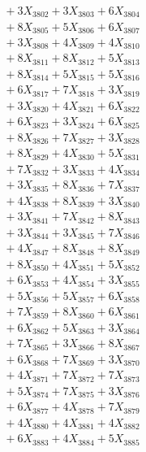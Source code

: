 \documentclass[a4paper,10pt]{article}
\begin{document}
{\begin{align}
&\;  + 3 X_{3802} + 3 X_{3803} + 6 X_{3804} \\[0.3ex]
&\;  + 8 X_{3805} + 5 X_{3806} + 6 X_{3807} \\[0.3ex]
&\;  + 3 X_{3808} + 4 X_{3809} + 4 X_{3810} \\[0.3ex]
&\;  + 8 X_{3811} + 8 X_{3812} + 5 X_{3813} \\[0.3ex]
&\;  + 8 X_{3814} + 5 X_{3815} + 5 X_{3816} \\[0.3ex]
&\;  + 6 X_{3817} + 7 X_{3818} + 3 X_{3819} \\[0.5ex]\allowbreak
&\;  + 3 X_{3820} + 4 X_{3821} + 6 X_{3822} \\[0.3ex]
&\;  + 6 X_{3823} + 3 X_{3824} + 6 X_{3825} \\[0.3ex]
&\;  + 8 X_{3826} + 7 X_{3827} + 3 X_{3828} \\[0.3ex]
&\;  + 8 X_{3829} + 4 X_{3830} + 5 X_{3831} \\[0.3ex]
&\;  + 7 X_{3832} + 3 X_{3833} + 4 X_{3834} \\[0.3ex]
&\;  + 3 X_{3835} + 8 X_{3836} + 7 X_{3837} \\[0.3ex]
&\;  + 4 X_{3838} + 8 X_{3839} + 3 X_{3840} \\[0.3ex]
&\;  + 3 X_{3841} + 7 X_{3842} + 8 X_{3843} \\[0.3ex]
&\;  + 3 X_{3844} + 3 X_{3845} + 7 X_{3846} \\[0.3ex]
&\;  + 4 X_{3847} + 8 X_{3848} + 8 X_{3849} \\[0.5ex]\allowbreak
&\;  + 8 X_{3850} + 4 X_{3851} + 5 X_{3852} \\[0.3ex]
&\;  + 6 X_{3853} + 4 X_{3854} + 3 X_{3855} \\[0.3ex]
&\;  + 5 X_{3856} + 5 X_{3857} + 6 X_{3858} \\[0.3ex]
&\;  + 7 X_{3859} + 8 X_{3860} + 6 X_{3861} \\[0.3ex]
&\;  + 6 X_{3862} + 5 X_{3863} + 3 X_{3864} \\[0.3ex]
&\;  + 7 X_{3865} + 3 X_{3866} + 8 X_{3867} \\[0.3ex]
&\;  + 6 X_{3868} + 7 X_{3869} + 3 X_{3870} \\[0.3ex]
&\;  + 4 X_{3871} + 7 X_{3872} + 7 X_{3873} \\[0.3ex]
&\;  + 5 X_{3874} + 7 X_{3875} + 3 X_{3876} \\[0.3ex]
&\;  + 6 X_{3877} + 4 X_{3878} + 7 X_{3879} \\[0.5ex]\allowbreak
&\;  + 4 X_{3880} + 4 X_{3881} + 4 X_{3882} \\[0.3ex]
&\;  + 6 X_{3883} + 4 X_{3884} + 5 X_{3885} \\[0.3ex]

\end{align}}
\end{document}
